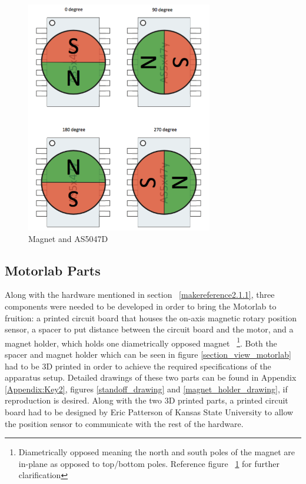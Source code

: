 \begin{figure}[htb]%
\begin{center}
    \includegraphics[height=4in]{figures/magnetic_field.png}

    \caption[Magnet and AS5047D]{Magnet and AS5047D \citep{1}}

    \label{magnet_rotation}
\end{center}
\end{figure}

\subsection{Motorlab Parts}
\label{makereference2.1.2} 

Along with the hardware mentioned in section ~\ref{makereference2.1.1}, three components were needed to be developed in order to bring the Motorlab to fruition: a printed circuit board that houses the on-axis magnetic rotary position sensor, a spacer to put distance between the circuit board and the motor, and a magnet holder, which holds one diametrically opposed magnet ~\footnote{Diametrically opposed meaning the north and south poles of the magnet are in-plane as opposed to top/bottom poles. Reference figure ~\ref{magnet_rotation} for further clarification}. Both the spacer and magnet holder which can be seen in figure \ref{section_view_motorlab} had to be 3D printed in order to achieve the required specifications of the apparatus setup. Detailed drawings of these two parts can be found in Appendix \ref{Appendix:Key2}, figures \ref{standoff_drawing} and \ref{magnet_holder_drawing}, if reproduction is desired. Along with the two 3D printed parts, a printed circuit board had to be designed by Eric Patterson of Kansas State University to allow the position sensor to communicate with the rest of the hardware.

